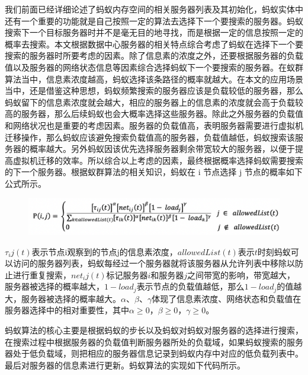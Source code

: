 我们前面已经详细论述了蚂蚁内存空间的相关服务器列表及其初始化，蚂蚁实体中还有一个重要的功能就是自己按照一定的算法去选择下一个要搜索的服务器。蚂蚁搜索下一个目标服务器时并不是毫无目的地寻找，而是根据一定的信息按照一定的概率去搜索。本文根据数据中心服务器的相关特点综合考虑了蚂蚁在选择下一个要搜索的服务器时所要考虑的因素。除了信息素的浓度之外，还要根据服务器的负载值以及服务器的网络状态信息等因素综合选择蚂蚁下一个要搜索的服务器。在蚁群算法当中，信息素浓度越高，蚂蚁选择该条路径的概率就越大。在本文的应用场景当中，还是借鉴这种思想，蚂蚁频繁搜索的服务器应该是负载较低的服务器，那么蚂蚁留下的信息素浓度就会越大，相应的服务器上的信息素的浓度就会高于负载较高的服务器，那么后续蚂蚁也会大概率选择这些服务器。除此之外服务器的负载值和网络状况也是重要的考虑因素。服务器的负载值高，表明服务器需要进行虚拟机迁移操作，那么蚂蚁应该避免搜索负载值高的服务器，负载值越低，蚂蚁搜索该服务器的概率越大。另外蚂蚁因该优先选择服务器剩余带宽较大的服务器，以便于提高虚拟机迁移的效率。所以综合以上考虑的因素，最终根据概率选择蚂蚁需要搜索的下一个服务器。根据蚁群算法的相关知识，蚂蚁在 i 节点选择 j 节点的概率如下公式所示。

\begin{figure}[ht]
  \centering
  \includegraphics{./Figure/IMG_Chap3_5.png}
  \caption{}\label{Fig:chap3_5}
\end{figure}

$τ_ij (t) $表示节点i观察到的节点j的信息素浓度，$allowedList(t) $表示$ t $时刻蚂蚁可以访问的服务器列表，蚂蚁每经过一个服务器就将该服务器从允许列表中移除以防止进行重复搜索，$net_ij (t) $标记服务器$ i $和服务器$ j $之间带宽的影响，带宽越大，服务器被选择的概率越大，$1 - load_j $表示节点的负载值越低，那么$ 1 - load_j $的值越大，服务器被选择的概率越大。$α、β、γ $体现了信息素浓度、网络状态和负载值在服务器选择中的相对重要性，其中$ α ≥0，β ≥0，γ ≥0 $。

蚂蚁算法的核心主要是根据蚂蚁的步长以及蚂蚁对蚂蚁对服务器的选择进行搜索，在搜索过程中根据服务器的负载值判断服务器所处的负载域，如果蚂蚁搜索的服务器处于低负载域，则把相应的服务器信息记录到蚂蚁内存中对应的低负载列表中。最后对服务器的信息素进行更新。蚂蚁算法的实现如下代码所示。

